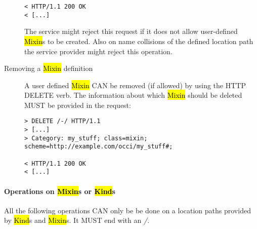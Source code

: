 \documentclass[10pt,a4paper]{article}
\begin{document}
\begin{description}
\begin{verbatim}
< HTTP/1.1 200 OK
< [...]
\end{verbatim}
The service might reject this request if it does not allow
user-defined \hl{Mixin}s to be created. Also on name collisions of the
defined location path the service provider might reject this
operation.

\item[Removing a \hl{Mixin} definition] A user defined
  \hl{Mixin} CAN be removed (if allowed) by using the HTTP DELETE
  verb. The information about which \hl{Mixin} should be deleted MUST
  be provided in the request:
\begin{verbatim}
> DELETE /-/ HTTP/1.1
> [...]
> Category: my_stuff; class=mixin; scheme=http://example.com/occi/my_stuff#;

< HTTP/1.1 200 OK
< [...]
\end{verbatim}
\end{description}

\paragraph{Operations on \hl{Mixin}s or \hl{Kind}s}
All the following operations CAN only be be done on a location paths
provided by \hl{Kind}s and \hl{Mixin}s. It MUST end with an
\emph{/}.
\end{document}
